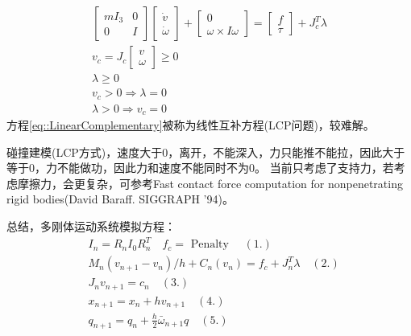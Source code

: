 \documentclass[lang=cn,newtx,10pt,scheme=chinese]{elegantbook}
\begin{document}
\begin{equation}
  \label{eq::LinearComplementary}
  \begin{gathered}
  {\left[\begin{array}{cc}
  m I_3 & 0 \\
  0 & I
  \end{array}\right]\left[\begin{array}{c}
  \dot{v} \\
  \dot{\omega}
  \end{array}\right]+\left[\begin{array}{c}
  0 \\
  \omega \times I \omega
  \end{array}\right]=\left[\begin{array}{l}
  f \\
  \tau
  \end{array}\right]+J_c^T \lambda} \\
  v_c=J_c\left[\begin{array}{c}
  v \\
  \omega
  \end{array}\right] \geq 0 \\
  \lambda \geq 0 \\
  v_c>0 \Rightarrow \lambda=0 \\
  \lambda>0 \Rightarrow v_c=0
  \end{gathered}
\end{equation}
方程\ref{eq::LinearComplementary}被称为线性互补方程(LCP问题)，较难解。

碰撞建模(LCP方式)，速度大于0，离开，不能深入，力只能推不能拉，因此大于等于0，力不能做功，因此力和速度不能同时不为0。
当前只考虑了支持力，若考虑摩擦力，会更复杂，可参考Fast contact force computation for nonpenetrating
rigid bodies(David Baraff. SIGGRAPH ’94)。

总结，多刚体运动系统模拟方程：
\begin{equation}
  \begin{aligned}
  & I_n=R_n I_0 R_n^T \quad f_c=\text { Penalty } \quad(1.) \\
  & M_n\left(v_{n+1}-v_n\right) / h+C_n\left(v_n\right)=f_c+J_n^T \lambda \quad(2.) \\
  & J_n v_{n+1}=c_n \quad(3.) \\
  & x_{n+1}=x_n+h v_{n+1} \quad(4.) \\
  & q_{n+1}=q_n+\frac{h}{2} \bar{\omega}_{n+1} q \quad(5.)
  \end{aligned}
\end{equation}
\end{document}
